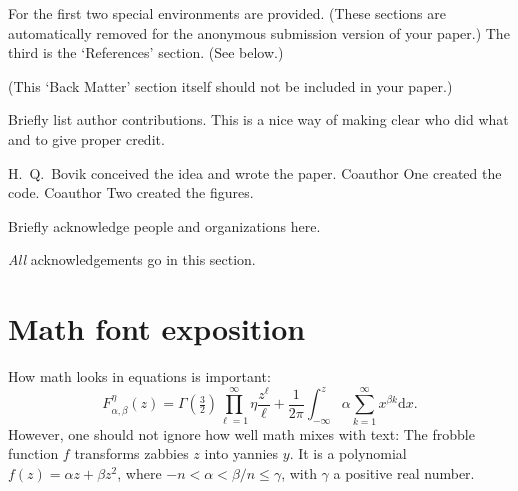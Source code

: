 \documentclass{uai2021} %
\begin{document}
For the first two special environments are provided.
(These sections are automatically removed for the anonymous submission version of your paper.)
The third is the ‘References’ section.
(See below.)

(This ‘Back Matter’ section itself should not be included in your paper.)

\begin{contributions} %
    Briefly list author contributions.
    This is a nice way of making clear who did what and to give proper credit.

    H.~Q.~Bovik conceived the idea and wrote the paper.
    Coauthor One created the code.
    Coauthor Two created the figures.
\end{contributions}

\begin{acknowledgements} %
    Briefly acknowledge people and organizations here.

    \emph{All} acknowledgements go in this section.
\end{acknowledgements}



\appendix
\providecommand{\upGamma}{\Gamma}
\providecommand{\uppi}{\pi}
\section{Math font exposition}
How math looks in equations is important:
\begin{equation*}
  F_{\alpha,\beta}^\eta(z) = \upGamma(\tfrac{3}{2}) \prod_{\ell=1}^\infty\eta \frac{z^\ell}{\ell} + \frac{1}{2\uppi}\int_{-\infty}^z\alpha \sum_{k=1}^\infty x^{\beta k}\mathrm{d}x.
\end{equation*}
However, one should not ignore how well math mixes with text:
The frobble function \(f\) transforms zabbies \(z\) into yannies \(y\).
It is a polynomial \(f(z)=\alpha z + \beta z^2\), where \(-n<\alpha<\beta/n\leq\gamma\), with \(\gamma\) a positive real number.
\end{document}
